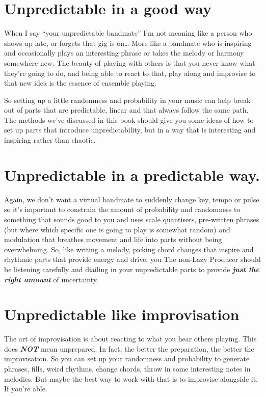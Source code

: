 \documentclass[
  12pt,
  letterpaper,
  oneside,
  open=any]{scrbook}
\begin{document}
\section{Unpredictable in a good way}\label{unpredictable-in-a-good-way}

When I say ``your unpredictable bandmate'' I'm not meaning like a person
who shows up late, or forgets that gig is on\ldots{} More like a
bandmate who is inspiring and occasionally plays an interesting phrase
or takes the melody or harmony somewhere new. The beauty of playing with
others is that you never know what they're going to do, and being able
to react to that, play along and improvise to that new idea is the
essence of ensemble playing.

So setting up a little randomness and probability in your music can help
break out of parts that are predictable, linear and that always follow
the same path. The methods we've discussed in this book should give you
some ideas of how to set up parts that introduce unpredictability, but
in a way that is interesting and inspiring rather than chaotic.

\section{Unpredictable in a predictable
way.}\label{unpredictable-in-a-predictable-way.}

Again, we don't want a virtual bandmate to suddenly change key, tempo or
pulse so it's important to constrain the amount of probability and
randomness to something that sounds good to you and uses scale
quantisers, pre-written phrases (but where which specific one is going
to play is somewhat random) and modulation that breathes movement and
life into parts without being overwhelming. So, like writing a melody,
picking chord changes that inspire and rhythmic parts that provide
energy and drive, you The non-Lazy Producer should be listening
carefully and diailing in your unpredictable parts to provide
\textbf{\emph{just the right amount}} of uncertainty.

\section{Unpredictable like
improvisation}\label{unpredictable-like-improvisation}

The art of improvisation is about reacting to what you hear others
playing. This does \textbf{\emph{NOT}} mean unprepared. In fact, the
better the preparation, the better the improvisation. So you can set up
your randomness and probability to generate phrases, fills, weird
rhythms, change chords, throw in some interesting notes in melodies. But
maybe the best way to work with that is to improvise alongside it. If
you're able.
\end{document}
